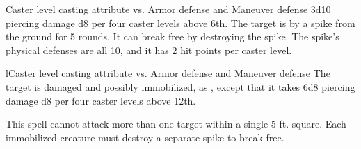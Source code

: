 \begin{spellheader}
    \spellrng{\rngmed}
\end{spellheader}
\begin{spelleffects}
    \begin{spellattack}{Caster level \add casting attribute vs. Armor defense and Maneuver defense}
         3d10 piercing damage \add d8 per four caster levels above 6th.
         The target is \immobilized by a spike from the ground for 5 rounds. It can break free by destroying the spike. The spike's physical defenses are all 10, and it has 2 hit points per caster level.
    \end{spellattack}
\end{spelleffects}
\begin{spellfooter}

\end{spellfooter}

\begin{spellheader}
    \spellrng{\rngmed}
\end{spellheader}
\begin{spelleffects}
    \begin{spellattack}l{Caster level \add casting attribute vs. Armor defense and Maneuver defense}
        \spellsuccess The target is damaged and possibly immobilized, as , except that it takes 6d8 piercing damage \add d8 per four caster levels above 12th.
    \end{spellattack}
\end{spelleffects}
\begin{spellfooter}
    \spellnotes This spell cannot attack more than one target within a single 5-ft. square. Each immobilized creature must destroy a separate spike to break free.
\end{spellfooter}


